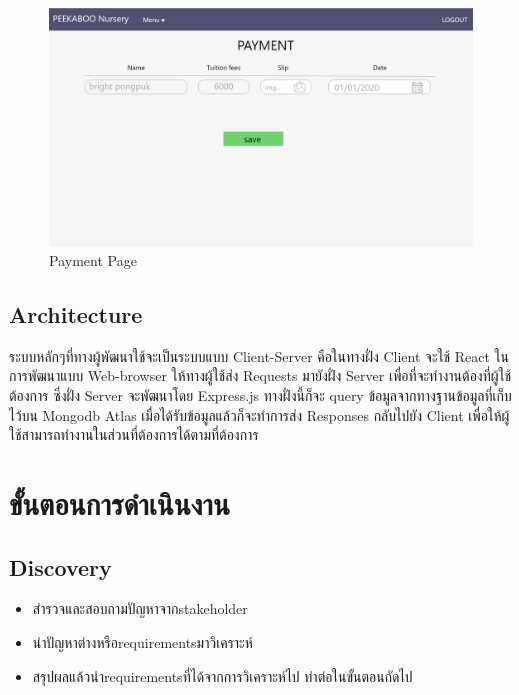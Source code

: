 \begin{figure}
  \begin{center}
  \includegraphics[width=\linewidth]{images/paymentPage.png}
  \end{center}
  \caption[Poem]{Payment Page}
  \label{fig:Payment}
  \end{figure}








\subsection{Architecture}

ระบบหลักๆที่ทางผู้พัฒนาใช้จะเป็นระบบแบบ Client-Server คือในทางฝั่ง Client จะใช้ React ในการพัฒนาแบบ Web-browser ให้ทางผู้ใช้ส่ง Requests มายังฝั่ง Server เพื่อที่จะทำงานต้องที่ผู้ใช้ต้องการ ซึ่งฝั่ง Server 
จะพัฒนาโดย Express.js ทางฝั่งนี้ก็จะ query ข้อมูลจากทางฐานข้อมูลที่เก็บไว้บน Mongodb Atlas เมื่อได้รับข้อมูลแล้วก็จะทำการส่ง Responses กลับไปยัง Client เพื่อให้ผู้ใช้สามารถทำงานในส่วนที่ต้องการได้ตามที่ต้องการ

\section{ขั้นตอนการดำเนินงาน}
\subsection{Discovery}
\begin{itemize}
  \item สำรวจและสอบถามปัญหาจากstakeholder
  \item นำปัญหาต่างหรือrequirementsมาวิเคราะห์
  \item สรุปผลแล้วนำrequirementsที่ได้จากการวิเคราะห์ไป  ทำต่อในขั้นตอนถัดไป
\end{itemize}

